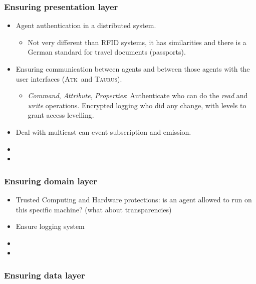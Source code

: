 \documentclass[10pt,a4paper,twoside]{llncs}
\newcommand{\taurus}{\textsc{Taurus}}
\newcommand{\atk}{\textsc{Atk}}
\begin{document}
\subsubsection{Ensuring presentation layer \label{sec:presentationLayer}}

\begin{itemize}
    \item Agent authentication in a distributed system.
    \begin{itemize}
     \item Not very different than RFID systems, it has similarities and there is a German standard \cite{BSI_TR-03110} for travel documents (passports).
    \end{itemize}
    \item Ensuring communication between agents and between those agents with the user interfaces (\atk\, and \taurus).
    \begin{itemize}
        \item \emph{Command}, \emph{Attribute}, \emph{Properties}: Authenticate who can do the \emph{read} and \emph{write} operations. Encrypted logging who did any change, with levels to grant access levelling.
    \end{itemize}
    \item Deal with multicast can event subscription and emission.
    \item 
    \item 
\end{itemize}


\subsubsection{Ensuring domain layer \label{sec:domainLayer}}

\begin{itemize}
    \item Trusted Computing and Hardware protections: is an agent allowed to run on this specific machine? (what about transparencies)
    \item Ensure logging system
    \item 
    \item
\end{itemize}


\subsubsection{Ensuring data layer \label{sec:dataLayer}}
\end{document}

